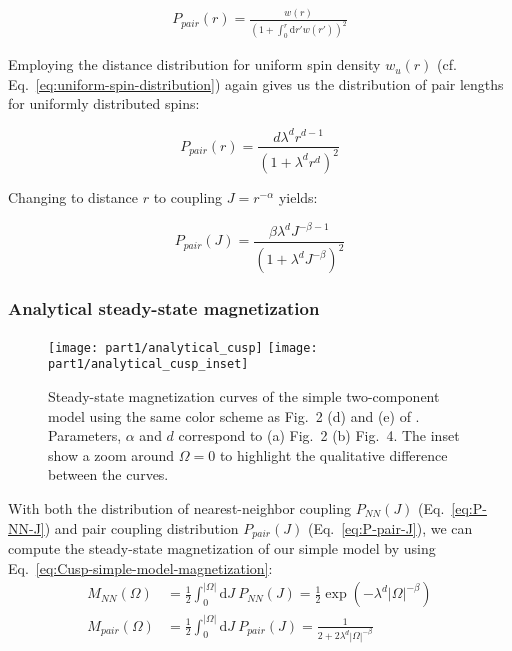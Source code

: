 \begin{align}\label{eq:pair-distribution}
	P_{pair}(r) = \frac{w(r)}{\left(1+\int_0^r\!\mathrm{d}r' w(r')\right)^2}
\end{align}

Employing the distance distribution for uniform spin density $w_u(r)$ (cf. Eq.~\ref{eq:uniform-spin-distribution}) again gives us the distribution of pair lengths for uniformly distributed spins:

\begin{equation}\label{eq:log-logistic-distribution}
	P_{pair}(r) = \frac{d\lambda^d r^{d-1}}{\left(1 + \lambda^d r^d\right)^2 }
\end{equation}


Changing to distance $r$ to coupling $J=r^{-\alpha}$ yields:

\begin{equation}\label{eq:P-pair-J}
	P_{pair}(J) = \frac{\beta\lambda^d J^{-\beta-1}}{\left(1+\lambda^{d}J^{-\beta}\right)^2}
\end{equation}

\subsubsection{Analytical steady-state magnetization}

\begin{figure}[htb]
	\centering
	\texttt{[image: part1/analytical\_cusp]}
	\texttt{[image: part1/analytical\_cusp\_inset]} 	%
	\caption{Steady-state magnetization curves of the simple two-component model using the same color scheme as Fig.~2 (d) and (e) of \cite{franzEmergentPairLocalization2022}. Parameters, $\alpha$ and $d$ correspond to (a) Fig.~2 (b) Fig.~4.
	The inset show a zoom around $\Omega=0$ to highlight the qualitative difference between the curves.
	}
	\label{fig:analytical-cusp}
\end{figure}

With both the distribution of nearest-neighbor coupling $P_{NN}(J)$ (Eq.~\ref{eq:P-NN-J}) and pair coupling distribution $P_{pair}(J)$ (Eq.~\ref{eq:P-pair-J}), we can compute the steady-state magnetization of our simple model by using Eq.~\ref{eq:Cusp-simple-model-magnetization}:
\begin{align}
	M_{NN}(\Omega) &= \frac{1}{2}\int_0^{|\Omega|}\!\mathrm{d}J\ P_{NN}(J) = \frac{1}{2}\exp(-\lambda^d |\Omega|^{-\beta})\\
	M_{pair}(\Omega) &= \frac{1}{2}\int_0^{|\Omega|}\!\mathrm{d}J\ P_{pair}(J) = \frac{1}{2+2\lambda^{d}|\Omega|^{-\beta}}
\end{align}

